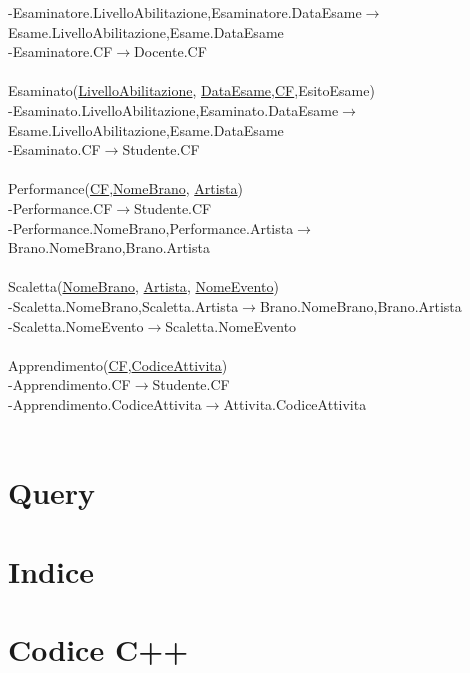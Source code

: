 \documentclass[11pt]{article}
\begin{document}
		-Esaminatore.LivelloAbilitazione,Esaminatore.DataEsame$\rightarrow$Esame.LivelloAbilitazione,Esame.DataEsame\\
		-Esaminatore.CF$\rightarrow$Docente.CF\\\\
		Esaminato(\underline{LivelloAbilitazione}, \underline{DataEsame},\underline{CF},EsitoEsame)\\
		-Esaminato.LivelloAbilitazione,Esaminato.DataEsame$\rightarrow$Esame.LivelloAbilitazione,Esame.DataEsame\\
		-Esaminato.CF$\rightarrow$Studente.CF\\\\
		Performance(\underline{CF},\underline{NomeBrano}, \underline{Artista})\\
		-Performance.CF$\rightarrow$Studente.CF\\
		-Performance.NomeBrano,Performance.Artista$\rightarrow$Brano.NomeBrano,Brano.Artista\\\\
		Scaletta(\underline{NomeBrano}, \underline{Artista}, \underline{NomeEvento})\\
		-Scaletta.NomeBrano,Scaletta.Artista$\rightarrow$Brano.NomeBrano,Brano.Artista\\
		-Scaletta.NomeEvento$\rightarrow$Scaletta.NomeEvento\\\\
		Apprendimento(\underline{CF},\underline{CodiceAttivita})\\
		-Apprendimento.CF$\rightarrow$Studente.CF\\
		-Apprendimento.CodiceAttivita$\rightarrow$Attivita.CodiceAttivita\\\\
\section{Query}
\section{Indice}
\section{Codice C++}
\end{document}
